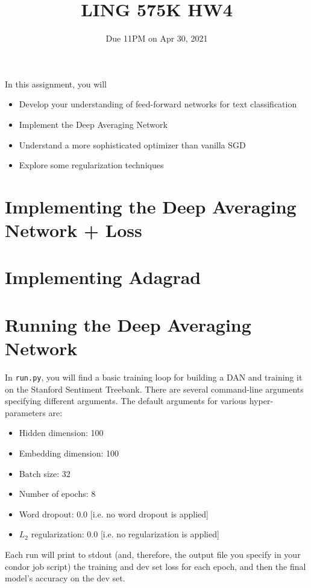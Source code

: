 \documentclass[11pt]{article}
\begin{document}
\title{LING 575K HW4}
\date{\vspace{-0.2in}Due 11PM on Apr 30, 2021}
\maketitle


\noindent In this assignment, you will 
\begin{itemize}
  \item Develop your understanding of feed-forward networks for text classification
  \item Implement the Deep Averaging Network
  \item Understand a more sophisticated optimizer than vanilla SGD
  \item Explore some regularization techniques
\end{itemize}


\section{Implementing the Deep Averaging Network + Loss}





\section{Implementing Adagrad}

\section{Running the Deep Averaging Network}

In \texttt{run.py}, you will find a basic training loop for building a DAN and training it on the Stanford Sentiment Treebank.  There are several command-line arguments specifying different arguments.  The default arguments for various hyper-parameters are:
\begin{itemize}
  \item Hidden dimension: 100
  \item Embedding dimension: 100
  \item Batch size: 32
  \item Number of epochs: 8
  \item Word dropout: 0.0 [i.e. no word dropout is applied]
  \item $L_2$ regularization: 0.0 [i.e. no regularization is applied]
\end{itemize}
Each run will print to stdout (and, therefore, the output file you specify in your condor job script) the training and dev set loss for each epoch, and then the final model's accuracy on the dev set.
\end{document}
